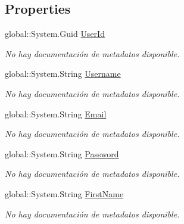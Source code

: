 \subsection*{Properties}
\begin{DoxyCompactItemize}
\item 
global\-::\-System.\-Guid \hyperlink{class_game_memory_1_1_users_a719eefec747bdad64f34d721febf4aef}{User\-Id}
\begin{DoxyCompactList}\small\item\em No hay documentación de metadatos disponible. \end{DoxyCompactList}\item 
global\-::\-System.\-String \hyperlink{class_game_memory_1_1_users_a679995b1dfe9cb52a344232e32351a57}{Username}
\begin{DoxyCompactList}\small\item\em No hay documentación de metadatos disponible. \end{DoxyCompactList}\item 
global\-::\-System.\-String \hyperlink{class_game_memory_1_1_users_aae427c5afcfec36bc3e06a306b631ca3}{Email}
\begin{DoxyCompactList}\small\item\em No hay documentación de metadatos disponible. \end{DoxyCompactList}\item 
global\-::\-System.\-String \hyperlink{class_game_memory_1_1_users_abb226cc2dac045639deb3f1efa109fab}{Password}
\begin{DoxyCompactList}\small\item\em No hay documentación de metadatos disponible. \end{DoxyCompactList}\item 
global\-::\-System.\-String \hyperlink{class_game_memory_1_1_users_af6e34812d5ef60563a0566e65bbe5e6b}{First\-Name}
\begin{DoxyCompactList}\small\item\em No hay documentación de metadatos disponible. \end{DoxyCompactList}\item 

\end{DoxyCompactItemize}
